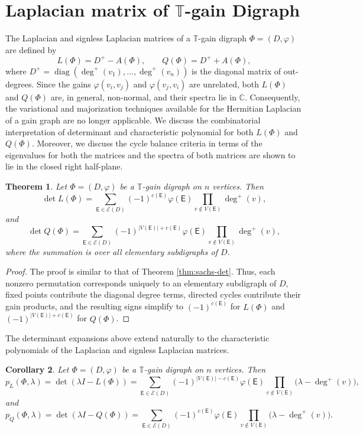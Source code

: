 \documentclass[12pt]{article}
\newtheorem{theorem}{Theorem}[section]
\newtheorem{corollary}[theorem]{Corollary}
\theoremstyle{definition}
\newcommand{\TT}{\mathbb{T}}
\begin{document}
\section{Laplacian matrix of $\TT$-gain Digraph} \label{sec5}

The Laplacian and signless Laplacian matrices of a $\TT$-gain digraph
$\Phi=(D,\varphi)$ are defined by
\[
L(\Phi)=D^{+}-A(\Phi), \qquad
Q(\Phi)=D^{+}+A(\Phi),
\]
where $D^{+}=\operatorname{diag}(\deg^{+}(v_1),\dots,\deg^{+}(v_n))$
is the diagonal matrix of out-degrees. Since the gains
$\varphi(v_i,v_j)$ and $\varphi(v_j,v_i)$ are unrelated, both
$L(\Phi)$ and $Q(\Phi)$ are, in general, non-normal, and their spectra lie in $\mathbb{C}$. Consequently, the variational and majorization techniques available for the Hermitian Laplacian of a gain graph are no longer applicable. We discuss the combinatorial interpretation of determinant and characteristic polynomial for both $L(\Phi)$ and $Q(\Phi)$. Moreover, we discuss the cycle balance criteria in terms of the eigenvalues for both the matrices and  the spectra of both matrices are shown to lie in the closed right half-plane.

\begin{theorem}\label{thm:coates}
Let $\Phi=(D,\varphi)$ be a $\mathbb{T}$-gain digraph on $n$ vertices. Then
\[
\det L(\Phi)
=
\sum_{\mathsf{E}\in\mathcal{E}(D)}
(-1)^{c(\mathsf{E})}
\varphi(\mathsf{E})
\prod_{v\notin V(\mathsf{E})}
\deg^{+}(v),
\]
and
\[
\det Q(\Phi)
=
\sum_{\mathsf{E}\in\mathcal{E}(D)}
(-1)^{|V(\mathsf{E})|+c(\mathsf{E})}
\varphi(\mathsf{E})
\prod_{v\notin V(\mathsf{E})}
\deg^{+}(v),
\]
where the summation is over all elementary subdigraphs of $D$.
\end{theorem}

\begin{proof}
The proof is similar to that of Theorem \ref{thm:sachs-det}. Thus, each nonzero permutation corresponds uniquely to an elementary subdigraph of $D$, fixed points contribute the diagonal degree terms, directed cycles contribute their gain products, and the resulting signs simplify to $(-1)^{c(\mathsf{E})}$ for $L(\Phi)$ and $(-1)^{|V(\mathsf{E})|+c(\mathsf{E})}$ for $Q(\Phi)$.
\end{proof}

The determinant expansions above extend naturally to the characteristic polynomials of the Laplacian and signless Laplacian matrices.

\begin{corollary}\label{cor:coates}
Let $\Phi=(D,\varphi)$ be a $\mathbb{T}$-gain digraph on $n$ vertices. Then
\[
p_L^{}(\Phi,\lambda)
=
\det(\lambda I-L(\Phi))
=
\sum_{\mathsf{E}\in\mathcal{E}(D)}
(-1)^{|V(\mathsf{E})|-c(\mathsf{E})}
\varphi(\mathsf{E})
\prod_{v\notin V(\mathsf{E})}
\bigl(\lambda-\deg^{+}(v)\bigr),
\]
and
\[
p_Q^{}(\Phi,\lambda)
=
\det(\lambda I-Q(\Phi))
=
\sum_{\mathsf{E}\in\mathcal{E}(D)}
(-1)^{c(\mathsf{E})}
\varphi(\mathsf{E})
\prod_{v\notin V(\mathsf{E})}
\bigl(\lambda-\deg^{+}(v)\bigr).
\]
\end{corollary}
\end{document}
